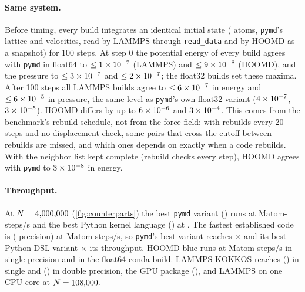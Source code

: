 \documentclass[11pt]{article}
\newcommand{\pymd}{\texttt{pymd}}
\begin{document}
\paragraph{Same system.} Before timing, every build integrates an identical initial state
(\cpVerN{} atoms, \pymd's lattice and velocities, read by LAMMPS through \texttt{read\_data} and
by HOOMD as a snapshot) for 100 steps. At step 0 the potential energy of every build agrees
with \pymd{} in float64 to $\le\num{1e-07}$ (LAMMPS) and $\le\num{9e-08}$
(HOOMD), and the pressure to $\le\num{3e-07}$ and $\le\num{2e-07}$; the
float32 builds set these maxima. After 100 steps all LAMMPS builds agree to
$\le\num{6e-07}$ in energy and $\le\num{6e-05}$ in pressure, the same
level as \pymd's own float32 variant ($\num{4e-07}$, $\num{3e-05}$).
HOOMD differs by up to $\num{6e-06}$ and $\num{3e-04}$. This comes from
the benchmark's rebuild schedule, not from the force field: with rebuilds every 20 steps and no
displacement check, some pairs that cross the cutoff between rebuilds are missed, and which
ones depends on exactly when a code rebuilds. With the neighbor list kept complete (rebuild
checks every step), HOOMD agrees with \pymd{} to $\num{3e-08}$ in energy.

\paragraph{Throughput.} At $N=4{,}000{,}000$ (\cref{fig:counterparts}) the best \pymd{} variant
(\texttt{\cpPymdVariant}) runs at \cpPymd{} Matom-steps/s and the best Python kernel language
(\texttt{\cpPymdPythonVariant}) at \cpPymdPython. The fastest established code is
\cpCounterCode{} \texttt{\cpCounterVariant} (\cpCounterPrec{} precision) at \cpCounter{}
Matom-steps/s, so \pymd's best variant reaches \cpRatioCounter$\times$ and its best
Python-DSL variant \cpRatioPythonCounter$\times$ its throughput. HOOMD-blue runs at
\cpHoomdSingle{} Matom-steps/s in single precision and \cpHoomdDouble{} in the float64 conda
build. LAMMPS KOKKOS reaches \cpKokkosSingle{} (\texttt{\cpKokkosSingleVariant}) in single and
\cpKokkosDouble{} (\texttt{\cpKokkosDoubleVariant}) in double precision, the GPU package
\cpLmpGpu{} (\texttt{\cpLmpGpuVariant}), and LAMMPS on one CPU core \cpLmpCpu{} at
$N=108{,}000$.
\end{document}
